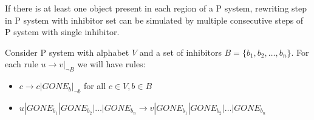 \begin{lema}
\label{lemma:inhibitor_step}
  If there is at least one object present in each region of a P system, rewriting step in P system with inhibitor set can be simulated by multiple consecutive steps of P system with single inhibitor.
\end{lema}

\begin{dokaz}
  Consider P system with alphabet $V$ and a set of inhibitors $B=\{b_1, b_2, \dots ,b_n\}$.
  For each rule $u\rightarrow v|_{\neg B}$ we will have rules:
  \begin{itemize}
    \item $c \rightarrow c|GONE_{b}|_{\neg b}$ for all $ c\in V, b\in B$
    \item $u|GONE_{b_1}|GONE_{b_2}|\dots|GONE_{b_n} \rightarrow v|GONE_{b_1}|GONE_{b_2}|\dots|GONE_{b_n}$
  \end{itemize}
\end{dokaz}